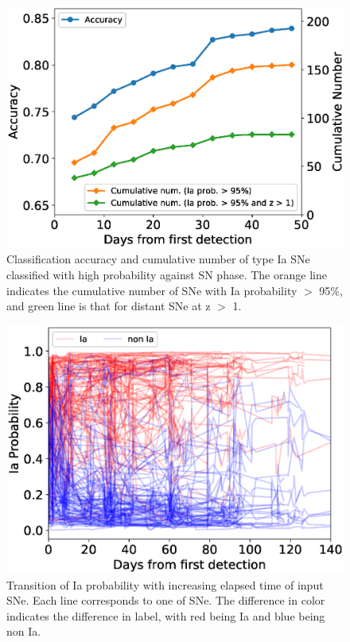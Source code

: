 \documentclass[useamsfonts]{pasj01}
\begin{document}
\begin{figure}[htbp]
  \begin{center}
     \includegraphics[width=\columnwidth]{figures/n_observations_SNphase_v200318.eps}
  \end{center}
  \caption{%
  Classification accuracy and cumulative number of type Ia SNe classified with high probability against SN phase.
  The orange line indicates the cumulative number of SNe with Ia probability $>$ 95\%, and green line is that for distant SNe at z $>$ 1. %
  }%
  \label{fig:n_observations_SNphase}
\end{figure}
%
%
\begin{figure}[htbp]
  \begin{center}
     \includegraphics[width=\columnwidth]{figures/n_observations_visualized_Ia_probability_200319.eps}
  \end{center}
  \caption{%
  Transition of Ia probability with increasing elapsed time of input SNe.
  Each line corresponds to one of SNe.
  The difference in color indicates the difference in label, with red being Ia and blue being non Ia.
  }%
  \label{fig:visualized_Ia_prob}
\end{figure}
\end{document}
